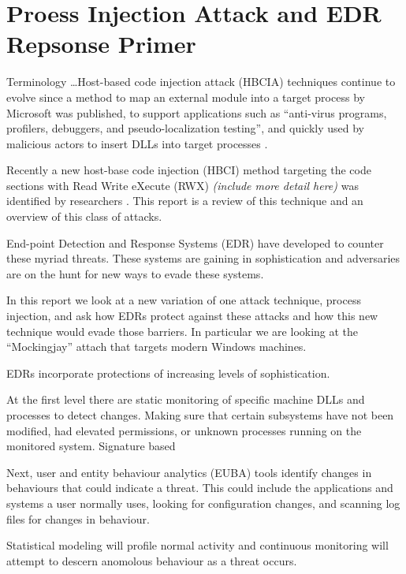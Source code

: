 


\section{Proess Injection Attack and EDR Repsonse Primer}


Terminology \ldots Host-based code injection attack (HBCIA) techniques \autocite{Barabosch:2014} continue to evolve since a method to map an external module into a target process by Microsoft \autocite{Ghizzoni:2004} was published, to support applications such as ``anti-virus programs, profilers, debuggers, and pseudo-localization testing'', and quickly used by malicious actors to insert DLLs into target processes \autocite{Jang:2007}.

Recently a new host-base code injection (HBCI) method targeting the code sections with Read Write eXecute (RWX)  \textit{(include more detail here)} was identified by researchers \autocite{Peixoto:2023}.  This report is a review of this technique and an overview of this class of attacks.


End-point Detection and Response Systems (EDR) have developed to counter these myriad threats.  These systems are gaining in sophistication and adversaries
are on the hunt for new ways to evade these systems.

In this report we look at a new variation of one attack technique, process injection, and ask how EDRs protect against these attacks and how
this new technique would evade those barriers.  In particular we are looking at the ``Mockingjay'' attach that targets modern Windows machines.

EDRs incorporate protections of increasing levels of sophistication.

At the first level there are static monitoring of specific machine DLLs and processes to detect changes.  Making sure that certain subsystems
have not been modified, had elevated permissions, or unknown processes running on the monitored system.  Signature based

Next, user and entity behaviour analytics (EUBA) tools identify changes in behaviours that could indicate a threat.  This could include the
applications and systems a user normally uses, looking for configuration changes, and scanning log files for changes in behaviour.

Statistical modeling will profile normal activity and continuous monitoring will attempt to descern anomolous behaviour as a threat occurs.

